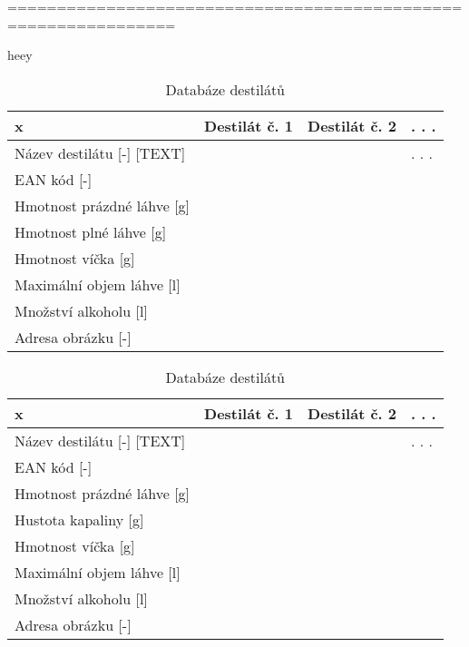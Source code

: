 





===============================================================

heey

\begin{table}[!h]
\centering
\begin{tabular}{|l|l|l|l|}
\hline
x & Destilát č. 1   & Destilát č. 2   &  . . . \\ \hline
Název destilátu [-] [TEXT] &    &    &  . . . \\ \hline
EAN kód [-]&  &    &        \\ \hline
Hmotnost prázdné láhve [g] &    &  &        \\ \hline
Hmotnost plné láhve [g] &    &    &  \\ \hline
Hmotnost víčka [g] &    &    &  \\ \hline
Maximální objem láhve [l] &    &    &  \\ \hline
Množství alkoholu [l] &    &    &  \\ \hline
Adresa obrázku [-] &    &    &  \\ \hline
\end{tabular}
\caption{Databáze destilátů}
\end{table}

\begin{table}[!h]
\centering
\begin{tabular}{|l|l|l|l|}
\hline
x & Destilát č. 1   & Destilát č. 2   &  . . . \\ \hline
Název destilátu [-] [TEXT] &    &    &  . . . \\ \hline
EAN kód [-]&  &    &        \\ \hline
Hmotnost prázdné láhve [g] &    &  &        \\ \hline
Hustota kapaliny [g] &    &    &  \\ \hline
Hmotnost víčka [g] &    &    &  \\ \hline
Maximální objem láhve [l] &    &    &  \\ \hline
Množství alkoholu [l] &    &    &  \\ \hline
Adresa obrázku [-] &    &    &  \\ \hline
\end{tabular}
\caption{Databáze destilátů}
\end{table}


